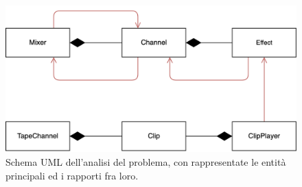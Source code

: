 \documentclass[a4paper,12pt]{report}
\begin{document}
\begin{figure}[H]
\centering{}
\includegraphics[scale=1.7]{img/domain.png}
\caption{Schema UML dell'analisi del problema, con rappresentate le entità principali ed i rapporti fra loro.}
\end{figure}
\end{document}
